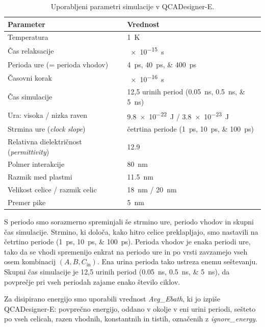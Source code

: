 \begin{table}[H]
\centering
\caption{Uporabljeni parametri simulacije v QCADesigner-E.}
\label{g19:tab:nastavitve}
\small
\begin{tabular}{ll}
\hline
Parameter & Vrednost \\
\hline
Temperatura & \SI{1}{\kelvin} \\
Čas relaksacije & \SI{e-15}{\second} \\
Perioda ure (= perioda vhodov) & \SIlist[list-units=single]{4;40;400}{\pico\second} \\
Časovni korak & \SI{e-16}{\second} \\
Čas simulacije & 12,5 urinih period (\SIlist[list-units=single]{0.05;0.5;5}{\nano\second})\\ 
Ura: visoka / nizka raven & \SI{9.8e-22}{\joule} / \SI{3.8e-23}{\joule} \\
Strmina ure (\textit{clock slope}) & četrtina periode (\SIlist[list-units=single]{1;10;100}{\pico\second}) \\
Relativna dielektričnost (\textit{permittivity}) & \num{12.9} \\
Polmer interakcije & \SI{80}{\nano\metre} \\
Razmik med plastmi & \SI{11.5}{\nano\metre} \\
\hline
Velikost celice / razmik celic & \SI{18}{\nano\metre} / \SI{20}{\nano\metre} \\
Premer pike & \SI{5}{\nano\metre} \\
\hline
\end{tabular}
\end{table}

S periodo smo sorazmerno spreminjali še strmino ure, periodo vhodov in skupni čas simulacije. Strmino, ki določa, kako hitro celice preklapljajo, smo nastavili na četrtino periode (\SIlist[list-units=single]{1;10;100}{\pico\second}). Perioda vhodov je enaka periodi ure, tako da se vhodi spremenijo enkrat na periodo ure in po vrsti zavzamejo vseh osem kombinacij $(A, B, C_\mathrm{in})$. Ena urina perioda tako ustreza enemu seštevanju. Skupni čas simulacije je 12,5 urinih period (\SIlist[list-units=single]{0.05;0.5;5}{\nano\second}), da povprečje pri vseh periodah zajame enako število ciklov.

Za disipirano energijo smo uporabili vrednost \textit{Avg\_Ebath}, ki jo izpiše QCADesigner-E: povprečno energijo, oddano v okolje v eni urini periodi, sešteto po vseh celicah, razen vhodnih, konstantnih in tistih, označenih z \textit{ignore\_energy}.


